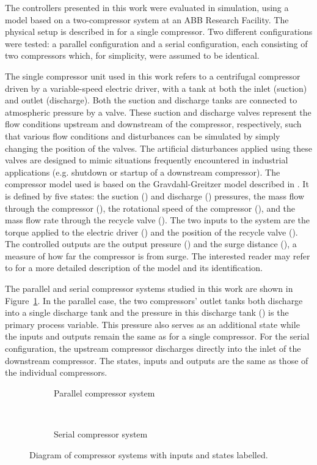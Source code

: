 The controllers presented in this work were evaluated in simulation, using a model based on a two-compressor system at an ABB Research Facility. 
The physical setup is described in \cite{Cortinovis2015} for a single compressor.
Two different configurations were tested: a parallel configuration and a serial configuration, each consisting of two compressors which, for simplicity, were assumed to be identical.

The single compressor unit used in this work refers to a centrifugal compressor driven by a variable-speed electric driver, with a tank at both the inlet (suction) and outlet (discharge).
Both the suction and discharge tanks are connected to atmospheric pressure by a valve.
These suction and discharge valves represent the flow conditions upstream and downstream of the compressor, respectively, such that various flow conditions and disturbances can be simulated by simply changing the position of the valves.
The artificial disturbances applied using these valves are designed to mimic situations frequently encountered in industrial applications (e.g. shutdown or startup of a downstream compressor).
The compressor model used is based on the Gravdahl-Greitzer model described in \cite{Gravdahl1999}. 
It is defined by five states: the suction () and discharge () pressures, the mass flow through the compressor (), the rotational speed of the compressor (), and the mass flow rate through the recycle valve ().
The two inputs to the system are the torque applied to the electric driver () and the position of the recycle valve ().
The controlled outputs are the output pressure () and the surge distance (), a measure of how far the compressor is from surge.
The interested reader may refer to \cite{Cortinovis2015} for a more detailed description of the model and its identification.

The parallel and serial compressor systems studied in this work are shown in Figure~\ref{fig:comp-systems-diagrams}.
In the parallel case, the two compressors' outlet tanks both discharge into a single discharge tank and the pressure in this discharge tank () is the primary process variable.
This pressure also serves as an additional state while the inputs and outputs remain the same as for a single compressor.
For the serial configuration, the upstream compressor discharges directly into the inlet of the downstream compressor.
The states, inputs and outputs are the same as those of the individual compressors.

\begin{figure}
  \begin{subfigure}{\linewidth}
    
    \caption{Parallel compressor system}
  \end{subfigure}
  \\
  \begin{subfigure}{\linewidth}
    
    \caption{Serial compressor system}
  \end{subfigure}
  \caption[Diagram of compressor systems.]{Diagram of compressor systems with inputs and states labelled.}
  \label{fig:comp-systems-diagrams}
\end{figure}


